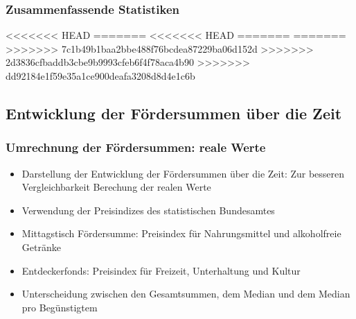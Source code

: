 \begin{frame}[fragile]
\frametitle{Zusammenfassende Statistiken}
<<<<<<< HEAD
=======
<<<<<<< HEAD
=======
=======
>>>>>>> 7c1b49b1baa2bbe488f76bcdea87229ba06d152d
>>>>>>> 2d3836cfbaddb3cbe9b9993cfeb6f4f78aca4b90
>>>>>>> dd92184e1f59e35a1ce900deafa3208d8d4e1c6b
\begin{table}[ht]
\centering
{}
\caption{Summary Statistics} 
\label{fundamentalDynamics}
\end{table}

\end{frame}

\subsection{Entwicklung der Fördersummen über die Zeit}

\begin{frame}[fragile]
\frametitle{Umrechnung der Fördersummen: reale Werte}
\begin{itemize}
  \item{Darstellung der Entwicklung der Fördersummen über die Zeit: Zur besseren Vergleichbarkeit Berechung der realen Werte}
  \item{Verwendung der Preisindizes des statistischen Bundesamtes}
  \item{Mittagstisch Fördersumme: Preisindex für Nahrungsmittel und alkoholfreie Getränke}
  \item{Entdeckerfonds: Preisindex für Freizeit, Unterhaltung und Kultur}
  \item{Unterscheidung zwischen den Gesamtsummen, dem Median und dem Median pro Begünstigtem}
\end{itemize}
\end{frame}

